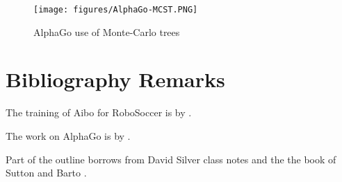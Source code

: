 \begin{figure}
  \begin{centering}
  \texttt{[image: figures/AlphaGo-MCST.PNG]}\\
  \caption{AlphaGo use of Monte-Carlo trees}\label{fig:AlphaGo-MCST}
  \end{centering}
\end{figure}

\section{Bibliography Remarks}

The training of Aibo for RoboSoccer is by \cite{KohlS04}.

The work on AlphaGo is by \cite{SilverHMGSDSAPL16}.

Part of the outline borrows from David Silver class notes and the
the book of Sutton and Barto \cite{SuttonB98}.
